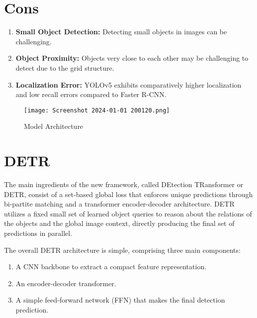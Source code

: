 \documentclass{article}
\begin{document}
\section{Cons}

\begin{enumerate}
    \item \textbf{Small Object Detection:} Detecting small objects in images can be challenging.
    
    \item \textbf{Object Proximity:} Objects very close to each other may be challenging to detect due to the grid structure.
    
    \item \textbf{Localization Error:} YOLOv5 exhibits comparatively higher localization and low recall errors compared to Faster R-CNN.

\end{enumerate}

\begin{figure}[H]
  \centering
  \texttt{[image: Screenshot 2024-01-01 200120.png]} %
  \caption{Model Architecture}
  \label{fig:example}
\end{figure}

\section{DETR}

The main ingredients of the new framework, called DEtection TRansformer or DETR, consist of a set-based global loss that enforces unique predictions through bi-partite matching and a transformer encoder-decoder architecture. DETR utilizes a fixed small set of learned object queries to reason about the relations of the objects and the global image context, directly producing the final set of predictions in parallel.

The overall DETR architecture is simple, comprising three main components:

\begin{enumerate}
    \item A CNN backbone to extract a compact feature representation.
    
    \item An encoder-decoder transformer.
    
    \item A simple feed-forward network (FFN) that makes the final detection prediction.
\end{enumerate}
\end{document}
